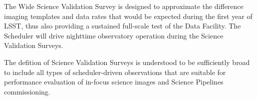 
The Wide Science Validation Survey is designed to approximate the difference imaging templates and data rates that would be expected during the first year of LSST, thus also providing a sustained full-scale test of the Data Facility.
The Scheduler will drive nighttime observatory operation during the Science Validation Surveys.

The defition of Science Validation Surveys is understood to be sufficiently broad to include all types of scheduler-driven observations that are suitable for performance evaluation of in-focus science images and Science Pipelines commissioning.





